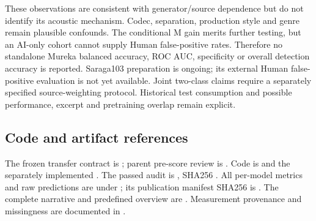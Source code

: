 These observations are consistent with generator/source dependence but do not
identify its acoustic mechanism. Codec, separation, production style and genre
remain plausible confounds. The conditional M gain merits further testing,
but an AI-only cohort cannot supply Human false-positive rates. Therefore no
standalone Mureka balanced accuracy, ROC AUC, specificity or overall detection
accuracy is reported. Saraga103 preparation is ongoing; its external Human
false-positive evaluation is not yet available. Joint two-class claims require
a separately specified source-weighting protocol. Historical test consumption
and possible performance, excerpt and pretraining overlap remain explicit.

\subsection{Code and artifact references}
The frozen transfer contract is
; parent
pre-score review is .
Code is  and the separately implemented
. The passed audit is
, SHA256
.
All per-model metrics and raw predictions are under
; its publication manifest
SHA256 is .
The complete narrative and predefined overview are
. Measurement provenance and
missingness are documented in .
